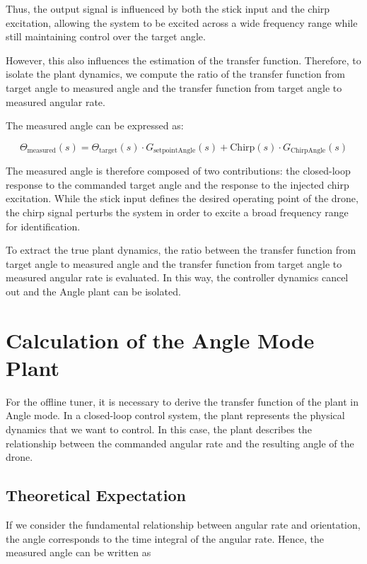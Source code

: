 \documentclass[a4paper,11pt,bibliography=totoc,listof=totoc]{scrreprt}
\begin{document}
Thus, the output signal is influenced by both the stick input and the chirp excitation, allowing the system to be excited across a wide frequency range while still maintaining control over the target angle.

However, this also influences the estimation of the transfer function. Therefore, to isolate the plant dynamics, we compute the ratio of the transfer function from target angle to measured angle and the transfer function from target angle to measured angular rate.

The measured angle can be expressed as:

\begin{equation}
\Theta_{\text{measured}}(s)
=
\Theta_{\text{target}}(s) \cdot G_{\text{setpointAngle}}(s)
+
\text{Chirp}(s) \cdot G_{\text{ChirpAngle}}(s)
\end{equation}

The measured angle is therefore composed of two contributions: the closed-loop response to the commanded target angle and the response to the injected chirp excitation. While the stick input defines the desired operating point of the drone, the chirp signal perturbs the system in order to excite a broad frequency range for identification.

To extract the true plant dynamics, the ratio between the transfer function from target angle to measured angle and the transfer function from target angle to measured angular rate is evaluated. In this way, the controller dynamics cancel out and the Angle plant can be isolated.

\newpage

\section{Calculation of the Angle Mode Plant}

For the offline tuner, it is necessary to derive the transfer function of the plant in Angle mode. In a closed-loop control system, the plant represents the physical dynamics that we want to control. In this case, the plant describes the relationship between the commanded angular rate and the resulting angle of the drone.
\subsection{Theoretical Expectation}

If we consider the fundamental relationship between angular rate and orientation,
the angle corresponds to the time integral of the angular rate. Hence, the measured
angle can be written as
\end{document}
